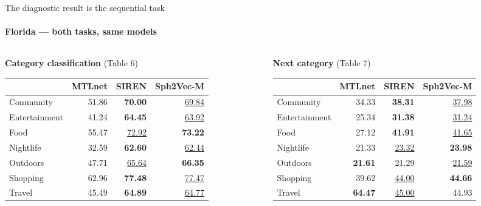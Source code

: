 \documentclass{beamer}
\begin{document}
\begin{frame}{The diagnostic result is the sequential task}
    \framesubtitle{Florida --- both tasks, same models}
    \vspace{0pt}%
    {\scriptsize\setlength{\tabcolsep}{1.6pt}\renewcommand{\arraystretch}{1.05}
    \begin{columns}[T,onlytextwidth]
    \begin{column}{0.485\textwidth}
        \centering \textbf{Category classification} {\tiny(Table 6)}\\[0.6mm]
        \begin{tabular}{@{}lrrr@{}}
            \toprule
             & \textbf{MTLnet} & \textbf{SIREN} & \textbf{Sph2Vec-M} \\
            \midrule
            Community     & 51.86 & \textbf{70.00} & \underline{69.84} \\
            Entertainment & 41.24 & \textbf{64.45} & \underline{63.92} \\
            Food          & 55.47 & \underline{72.92} & \textbf{73.22} \\
            Nightlife     & 32.59 & \textbf{62.60} & \underline{62.44} \\
            Outdoors      & 47.71 & \underline{65.64} & \textbf{66.35} \\
            Shopping      & 62.96 & \textbf{77.48} & \underline{77.47} \\
            Travel        & 45.49 & \textbf{64.89} & \underline{64.77} \\
            \bottomrule
        \end{tabular}
    \end{column}
    \begin{column}{0.485\textwidth}
        \centering \textbf{Next category} {\tiny(Table 7)}\\[0.6mm]
        \begin{tabular}{@{}lrrr@{}}
            \toprule
             & \textbf{MTLnet} & \textbf{SIREN} & \textbf{Sph2Vec-M} \\
            \midrule
            Community     & 34.33 & \textbf{38.31} & \underline{37.98} \\
            Entertainment & 25.34 & \textbf{31.38} & \underline{31.24} \\
            Food          & 27.12 & \textbf{41.91} & \underline{41.65} \\
            Nightlife     & 21.33 & \underline{23.32} & \textbf{23.98} \\
            Outdoors      & \textbf{21.61} & 21.29 & \underline{21.59} \\
            Shopping      & 39.62 & \underline{44.00} & \textbf{44.66} \\
            Travel        & \textbf{64.47} & \underline{45.00} & 44.93 \\
            \bottomrule
        \end{tabular}
    \end{column}
    \end{columns}\par}


\end{frame}
\end{document}
